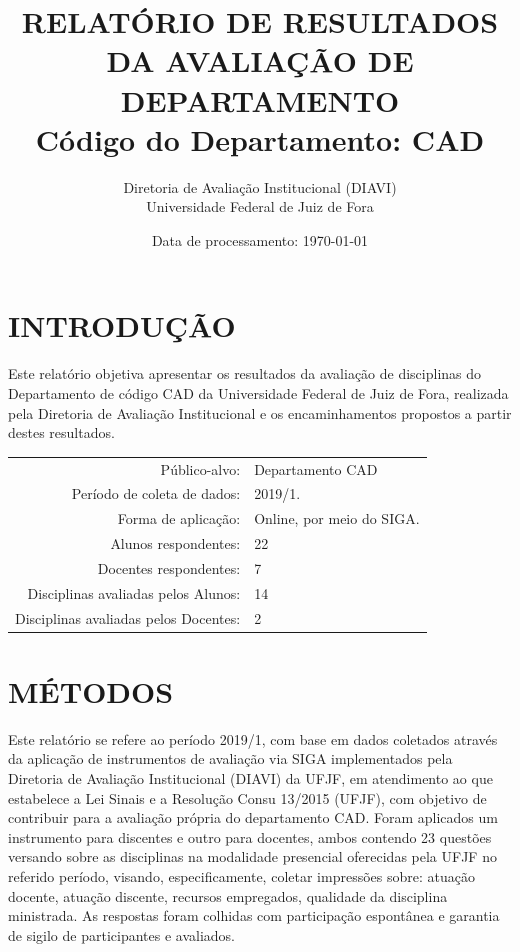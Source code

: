 \documentclass[a4paper,10pt]{article}
\date{Data de processamento: \today}
\begin{document}
\author{Diretoria de Avaliação Institucional (DIAVI) \\ Universidade Federal de Juiz de Fora}

\title{RELATÓRIO DE RESULTADOS DA AVALIAÇÃO DE DEPARTAMENTO\\ Código do Departamento: CAD}
\maketitle
\section{INTRODUÇÃO}
Este relatório objetiva apresentar os resultados da avaliação de disciplinas do Departamento     de código CAD da Universidade Federal de Juiz de Fora, realizada pela     Diretoria de Avaliação Institucional e os encaminhamentos propostos a     partir destes resultados.

\begin{center}
\begin{tabularx}{\linewidth}{r|X}

Público-alvo:& Departamento  CAD\\

Período de coleta de dados:& 2019/1.\\

Forma de aplicação:& Online, por meio do SIGA.\\

Alunos   respondentes:& 22\\

Docentes respondentes:& 7\\

Disciplinas avaliadas pelos   Alunos:& 14\\

Disciplinas avaliadas pelos Docentes:& 2\\
\end{tabularx}
\end{center}

\section{MÉTODOS}
Este relatório se refere ao período 2019/1, com base em dados     coletados através da aplicação de instrumentos de avaliação via SIGA     implementados pela Diretoria de Avaliação Institucional (DIAVI) da UFJF, em atendimento     ao que estabelece a Lei Sinais e a Resolução Consu 13/2015 (UFJF),     com objetivo de contribuir para a avaliação própria do departamento CAD.    Foram aplicados um instrumento para discentes e outro para docentes, ambos contendo     23 questões versando sobre as disciplinas na modalidade presencial oferecidas pela UFJF no     referido período, visando, especificamente, coletar impressões sobre: atuação docente, atuação discente,     recursos empregados, qualidade da disciplina ministrada.     As respostas foram colhidas      com participação espontânea e garantia de    sigilo de participantes e avaliados.
\end{document}
